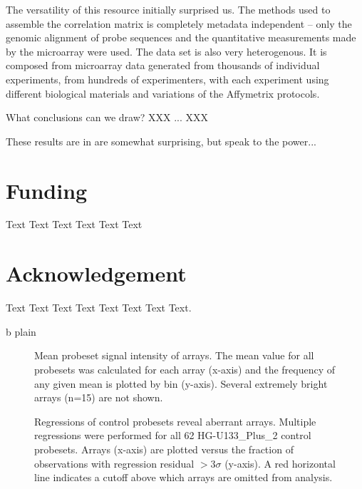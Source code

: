 \documentclass{bioinfo}
\begin{document}
The versatility of this resource initially surprised us.  The methods used to
assemble the correlation matrix is completely metadata independent -- only the
genomic alignment of probe sequences and the quantitative measurements made by
the microarray were used.  The data set is also very heterogenous.  It is
composed from microarray data generated from thousands of individual
experiments, from hundreds of experimenters, with each experiment using
different biological materials and variations of the Affymetrix protocols.

What conclusions can we draw? XXX ... XXX

 
These results are in are somewhat surprising, but speak to the power...

\section*{Funding}
Text Text Text Text Text Text

\section*{Acknowledgement}
Text Text Text Text Text Text  Text Text.

 {b}
 {plain}
\newpage



\begin{figure}[!tpb]
\label{figure:means}
\centerline{}
\caption{Mean probeset signal intensity of arrays.  The mean value for all probesets was
calculated for each array (x-axis) and the frequency of any given mean is
plotted by bin (y-axis).  Several extremely bright arrays (n=15) are not shown.}
\end{figure}


\begin{figure}[!tpb]
\label{figure:rsquare}
\centerline{}
\caption{Regressions of control probesets reveal aberrant arrays.  Multiple regressions
were performed for all 62 HG-U133\_Plus\_2 control probesets.  Arrays (x-axis)
are plotted versus the fraction of observations with regression residual
$>3\sigma$ (y-axis).  A red horizontal line indicates a cutoff above which
arrays are omitted from analysis.}
\end{figure}
\end{document}
